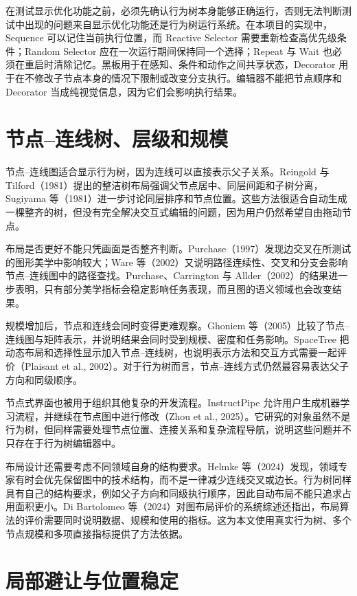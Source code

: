 \documentclass[11pt,a4paper,oneside,extrafontsizes]{memoir}
\begin{document}
在测试显示优化功能之前，必须先确认行为树本身能够正确运行，否则无法判断测试中出现的问题来自显示优化功能还是行为树运行系统。在本项目的实现中，Sequence 可以记住当前执行位置，而 Reactive Selector 需要重新检查高优先级条件；Random Selector 应在一次运行期间保持同一个选择；Repeat 与 Wait 也必须在重启时清除记忆。黑板用于在感知、条件和动作之间共享状态，Decorator 用于在不修改子节点本身的情况下限制或改变分支执行。编辑器不能把节点顺序和 Decorator 当成纯视觉信息，因为它们会影响执行结果。

\section{节点–连线树、层级和规模}

节点–连线图适合显示行为树，因为连线可以直接表示父子关系。Reingold 与 Tilford（1981）提出的整洁树布局强调父节点居中、同层间距和子树分离，Sugiyama 等（1981）进一步讨论同层排序和节点位置。这些方法很适合自动生成一棵整齐的树，但没有完全解决交互式编辑的问题，因为用户仍然希望自由拖动节点。

布局是否更好不能只凭画面是否整齐判断。Purchase（1997）发现边交叉在所测试的图形美学中影响较大；Ware 等（2002）又说明路径连续性、交叉和分支会影响节点–连线图中的路径查找。Purchase、Carrington 与 Allder（2002）的结果进一步表明，只有部分美学指标会稳定影响任务表现，而且图的语义领域也会改变结果。

规模增加后，节点和连线会同时变得更难观察。Ghoniem 等（2005）比较了节点–连线图与矩阵表示，并说明结果会同时受到规模、密度和任务影响。SpaceTree 把动态布局和选择性显示加入节点–连线树，也说明表示方法和交互方式需要一起评价（Plaisant et al., 2002）。对于行为树而言，节点–连线方式仍然最容易表达父子方向和同级顺序。

节点式界面也被用于组织其他复杂的开发流程。InstructPipe 允许用户生成机器学习流程，并继续在节点图中进行修改（Zhou et al., 2025）。它研究的对象虽然不是行为树，但同样需要处理节点位置、连接关系和复杂流程导航，说明这些问题并不只存在于行为树编辑器中。

布局设计还需要考虑不同领域自身的结构要求。Helmke 等（2024）发现，领域专家有时会优先保留图中的技术结构，而不是一律减少连线交叉或边长。行为树同样具有自己的结构要求，例如父子方向和同级执行顺序，因此自动布局不能只追求占用面积更小。Di Bartolomeo 等（2024）对图布局评价的系统综述还指出，布局算法的评价需要同时说明数据、规模和使用的指标。这为本文使用真实行为树、多个节点规模和多项直接指标提供了方法依据。

\section{局部避让与位置稳定}
\end{document}
